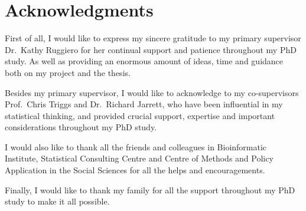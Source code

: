 \chapter*{Acknowledgments}

First of all, I would like to express my sincere gratitude to my primary supervisor Dr.\ Kathy Ruggiero for her continual support and patience throughout my PhD study. As well as providing an enormous amount of ideas, time and guidance both on my project and the thesis.

Besides my primary supervisor, I would like to acknowledge to my co-supervisors Prof.\ Chris Triggs and Dr.\ Richard Jarrett, who have been influential in my statistical thinking, and provided crucial support, expertise and important considerations throughout my PhD study.
 
I would also like to thank all the friends and colleagues in Bioinformatic Institute, Statistical Consulting Centre and Centre of Methods and Policy Application in the Social Sciences for all the helps and encouragements. 

Finally, I would like to thank my family for all the support throughout my PhD study to make it all possible.

